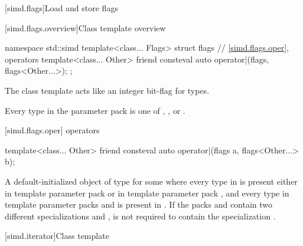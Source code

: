 [simd.flags]{Load and store flags}

[simd.flags.overview]{Class template  overview}

\begin{codeblock}
namespace std::simd {
  template<class... Flags> struct flags {
    // \ref{simd.flags.oper},  operators
    template<class... Other>
      friend consteval auto operator|(flags, flags<Other...>);
  };
}
\end{codeblock}

\pnum
\begin{note}
The class template  acts like an integer bit-flag for types.
\end{note}

\pnum
\constraints
Every type in the parameter pack  is one of ,
, or .

[simd.flags.oper]{ operators}

\begin{itemdecl}
template<class... Other>
  friend consteval auto operator|(flags a, flags<Other...> b);
\end{itemdecl}

\begin{itemdescr}
\pnum
\returns
  A default-initialized object of type  for some
   where every type in  is present either in template parameter pack
   or in template parameter pack , and every type in template parameter
  packs  and  is present in .
  If the packs  and  contain two
  different specializations  and
  ,  is not required to contain the
  specialization .
\end{itemdescr}

[simd.iterator]{Class template }

